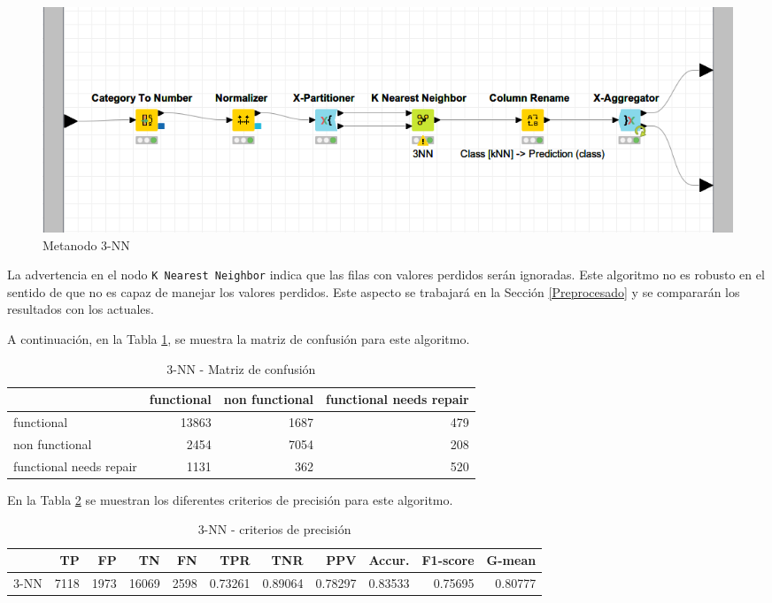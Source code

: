 \documentclass[a4paper, 20pt]{article}
\begin{document}
\begin{figure}[H]
    \centering
    \includegraphics[width=1\textwidth]{3nn}
    \caption{Metanodo 3-NN}
    \label{fig:3nn}
\end{figure}

La advertencia en el nodo \texttt{K Nearest Neighbor} indica que las filas con valores perdidos serán ignoradas. Este algoritmo no es robusto en el sentido de que no es capaz de manejar los valores perdidos. Este aspecto se trabajará en la Sección \ref{Preprocesado} y se compararán los resultados con los actuales.

A continuación, en la Tabla \ref{tab:CM3nn}, se muestra la matriz de confusión para este algoritmo.

\begin{table}[H]
  \centering
  \caption{3-NN - Matriz de confusión}
  \label{tab:CM3nn}
  \begin{tabular}{lrrr}
    \toprule
    & functional & non functional & functional needs repair\\ \midrule
    functional & 13863 & 1687 & 479\\
    non functional & 2454 & 7054 & 208\\
    functional needs repair & 1131 & 362 & 520\\
    \bottomrule
  \end{tabular}
\end{table}


En la Tabla \ref{tab:3nn} se muestran los diferentes criterios de precisión para este algoritmo.

\begin{table}[H]
  \centering
  \caption{3-NN - criterios de precisión}
  \label{tab:3nn}
  \begin{tabular}{lrrrrrrrrrr}
    \toprule
    & TP & FP & TN & FN & TPR & TNR & PPV & Accur. & F1-score & G-mean\\ \midrule
3-NN  & 7118 & 1973 & 16069 & 2598 & 0.73261 & 0.89064 & 0.78297 & 0.83533 & 0.75695 & 0.80777\\
\bottomrule
  \end{tabular}
\end{table}
\end{document}
